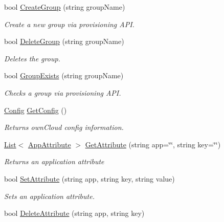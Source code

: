 \begin{DoxyCompactItemize}
bool \hyperlink{classowncloudsharp_1_1_client_ae3f6b18765fa47eed193eae4db94ae2c}{Create\+Group} (string group\+Name)
\begin{DoxyCompactList}\small\item\em Create a new group via provisioning A\+P\+I. \end{DoxyCompactList}\item 
bool \hyperlink{classowncloudsharp_1_1_client_a83390a9710020ecc7513dd03a23e192f}{Delete\+Group} (string group\+Name)
\begin{DoxyCompactList}\small\item\em Deletes the group. \end{DoxyCompactList}\item 
bool \hyperlink{classowncloudsharp_1_1_client_a0eb9c35f345906e16175605b0cc08ade}{Group\+Exists} (string group\+Name)
\begin{DoxyCompactList}\small\item\em Checks a group via provisioning A\+P\+I. \end{DoxyCompactList}\item 
\hyperlink{classowncloudsharp_1_1_types_1_1_config}{Config} \hyperlink{classowncloudsharp_1_1_client_a6c228561d4c74c310b898ad8bd60095b}{Get\+Config} ()
\begin{DoxyCompactList}\small\item\em Returns own\+Cloud config information. \end{DoxyCompactList}\item 
\hyperlink{classowncloudsharp_1_1_client_a914c144ebbe207958829523f7eda3609}{List}$<$ \hyperlink{classowncloudsharp_1_1_types_1_1_app_attribute}{App\+Attribute} $>$ \hyperlink{classowncloudsharp_1_1_client_a8f843f60b178973e988c0edabef26c49}{Get\+Attribute} (string app=\char`\"{}\char`\"{}, string key=\char`\"{}\char`\"{})
\begin{DoxyCompactList}\small\item\em Returns an application attribute \end{DoxyCompactList}\item 
bool \hyperlink{classowncloudsharp_1_1_client_a0939782439f44c5250d66147755d4c25}{Set\+Attribute} (string app, string key, string value)
\begin{DoxyCompactList}\small\item\em Sets an application attribute. \end{DoxyCompactList}\item 
bool \hyperlink{classowncloudsharp_1_1_client_ad94e83b297c9de310beafd878fd99bc4}{Delete\+Attribute} (string app, string key)

\end{DoxyCompactItemize}

